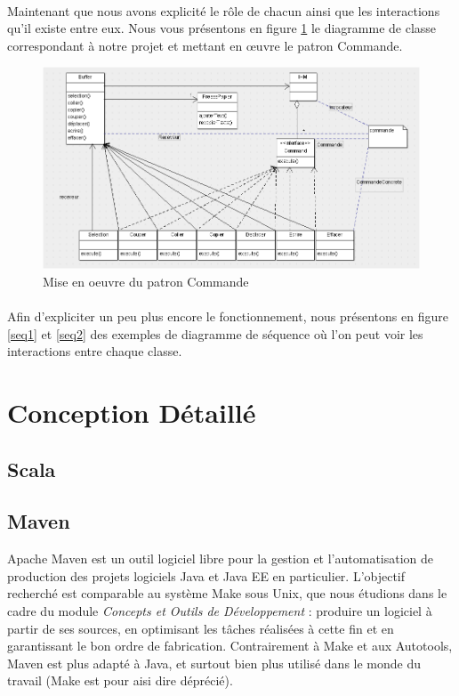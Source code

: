 \documentclass[a4paper,11pt]{article}
\begin{document}
\paragraph{}
Maintenant que nous avons explicité le rôle de chacun ainsi que les interactions qu'il existe entre eux. Nous vous présentons en figure \ref{command} le diagramme de classe correspondant à notre projet et mettant en œuvre le patron Commande.

\begin{figure}[!ht]
		\center
		\includegraphics [width=15cm]{Command.png}
		\caption{Mise en oeuvre du patron Commande}
		\label{command}
\end{figure}

\paragraph{}
Afin d'expliciter un peu plus encore le fonctionnement, nous présentons en figure \ref{seq1} et \ref{seq2} des exemples de diagramme de séquence où l'on peut voir les interactions entre chaque classe.




\section{Conception Détaillé}

\subsection{Scala}



\subsection{Maven}
Apache Maven est un outil logiciel libre pour la gestion et l'automatisation de production des projets logiciels Java et Java EE en particulier. L'objectif recherché est comparable au système Make sous Unix, que nous étudions dans le cadre du module \textit{Concepts et Outils de Développement} : produire un logiciel à partir de ses sources, en optimisant les tâches réalisées à cette fin et en garantissant le bon ordre de fabrication. Contrairement à Make et aux Autotools, Maven est plus adapté à Java, et surtout bien plus utilisé dans le monde du travail (Make est pour aisi dire déprécié).
\end{document}
